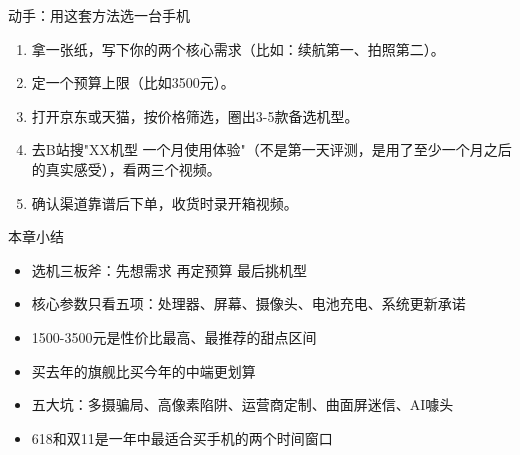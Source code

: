 \begin{tcbpractice}{动手：用这套方法选一台手机}
\begin{enumerate}
  \item 拿一张纸，写下你的两个核心需求（比如：续航第一、拍照第二）。
  \item 定一个预算上限（比如3500元）。
  \item 打开京东或天猫，按价格筛选，圈出3-5款备选机型。
  \item 去B站搜"XX机型 一个月使用体验"（不是第一天评测，是用了至少一个月之后的真实感受），看两三个视频。
  \item 确认渠道靠谱后下单，收货时录开箱视频。
\end{enumerate}

\end{tcbpractice}

\begin{tcbsummary}{本章小结}
\begin{itemize}
  \item 选机三板斧：先想需求 再定预算 最后挑机型
  \item 核心参数只看五项：处理器、屏幕、摄像头、电池充电、系统更新承诺
  \item 1500-3500元是性价比最高、最推荐的甜点区间
  \item 买去年的旗舰比买今年的中端更划算
  \item 五大坑：多摄骗局、高像素陷阱、运营商定制、曲面屏迷信、AI噱头
  \item 618和双11是一年中最适合买手机的两个时间窗口
\end{itemize}

\end{tcbsummary}
